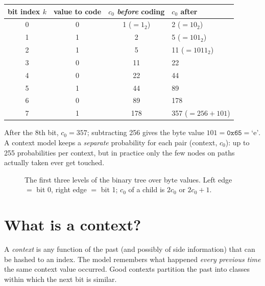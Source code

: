\documentclass[11pt,a4paper,openany]{book}
\theoremstyle{definition}
\theoremstyle{remark}
\begin{document}
\begin{example}[Coding the letter `e' ($=\texttt{0x65}=01100101_2$)]
\begin{center}
\begin{tabular}{@{}cccl@{}}
\toprule
bit index $k$ & value to code & $c_0$ \emph{before} coding & $c_0$ after\\
\midrule
0 & 0 & 1 ($=1_2$) & 2 ($=10_2$)\\
1 & 1 & 2 & 5 ($=101_2$)\\
2 & 1 & 5 & 11 ($=1011_2$)\\
3 & 0 & 11 & 22\\
4 & 0 & 22 & 44\\
5 & 1 & 44 & 89\\
6 & 0 & 89 & 178\\
7 & 1 & 178 & 357 ($=256+101$)\\
\bottomrule
\end{tabular}
\end{center}
After the 8th bit, $c_0=357$; subtracting 256 gives the byte value $101=\texttt{0x65}=\text{`e'}$. A context model keeps a \emph{separate} probability for each pair (context, $c_0$): up to 255 probabilities per context, but in practice only the few nodes on paths actually taken ever get touched.
\end{example}

\begin{figure}[h]
\centering
{}
\caption{The first three levels of the binary tree over byte values. Left edge $=$ bit 0, right edge $=$ bit 1; $c_0$ of a child is $2c_0$ or $2c_0+1$.}
\end{figure}

\section{What is a context?}

A \emph{context} is any function of the past (and possibly of side information) that can be hashed to an index. The model remembers what happened \emph{every previous time} the same context value occurred. Good contexts partition the past into classes within which the next bit is similar.
\end{document}
